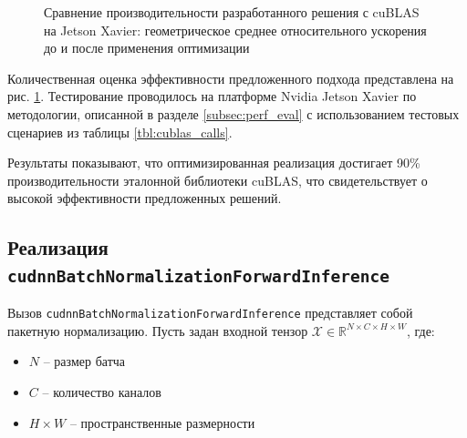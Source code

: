 \begin{figure}[ht]
\centering
{}
\caption{Сравнение производительности разработанного решения с cuBLAS на Jetson Xavier: геометрическое среднее
относительного ускорения до и после применения оптимизации}
\label{fig:cublas_bar}
\end{figure}

Количественная оценка эффективности предложенного подхода представлена на рис. \ref{fig:cublas_bar}. Тестирование проводилось на
платформе Nvidia Jetson Xavier по методологии, описанной в разделе \ref{subsec:perf_eval} с использованием тестовых сценариев из таблицы
\ref{tbl:cublas_calls}.

Результаты показывают, что оптимизированная реализация достигает 90\% производительности эталонной библиотеки cuBLAS, что свидетельствует о высокой
эффективности предложенных решений.

\subsection{Реализация \texttt{cudnnBatchNormalizationForwardInference}}
Вызов \texttt{cudnnBatchNormalizationForwardInference} представляет собой пакетную нормализацию.
Пусть задан входной тензор $\mathcal{X} \in \mathbb{R}^{N \times C \times H \times W}$, где:
\begin{itemize}
    \item $N$ -- размер батча
    \item $C$ -- количество каналов
    \item $H \times W$ -- пространственные размерности
\end{itemize}

